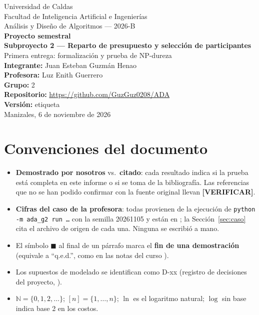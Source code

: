 \documentclass[11pt,a4paper]{article}
\theoremstyle{plain}
\theoremstyle{definition}
\theoremstyle{remark}
\newcommand{\Nat}{\mathbb{N}}
\newcommand{\VER}{\textbf{[VERIFICAR]}}
\begin{document}
\begin{titlepage}
\centering
{\large Universidad de Caldas\\ Facultad de Inteligencia Artificial e Ingenierías\\[0.3cm]}
{\large Análisis y Diseño de Algoritmos — 2026-B\\[2cm]}
{\LARGE\bfseries Proyecto semestral\\[0.3cm]
Subproyecto 2 — Reparto de presupuesto y selección de participantes\\[0.6cm]}
{\Large Primera entrega: formalización y prueba de NP-dureza\\[2cm]}
{\large \textbf{Integrante:} Juan Esteban Guzmán Henao\\[0.3cm]
\textbf{Profesora:} Luz Enith Guerrero\\[0.3cm]
\textbf{Grupo:} 2\\[0.3cm]
\textbf{Repositorio:} \url{https://github.com/GuzGuz0208/ADA}\\[0.3cm]
\textbf{Versión:} etiqueta \\[2cm]}
{\large Manizales, 6 de noviembre de 2026}
\end{titlepage}

\tableofcontents
\newpage

\section*{Convenciones del documento}
\begin{itemize}[leftmargin=*]
\item \textbf{Demostrado por nosotros} vs.\ \textbf{citado}: cada resultado indica si la prueba está completa en este informe o si se toma de la bibliografía. Las referencias que no se han podido confirmar con la fuente original llevan \VER.
\item \textbf{Cifras del caso de la profesora}: todas provienen de la ejecución de \texttt{python -m ada\_g2 run \dots} con la semilla 20261105 y están en ; la Sección~\ref{sec:caso} cita el archivo de origen de cada una. Ninguna se escribió a mano.
\item El símbolo $\blacksquare$ al final de un párrafo marca el \textbf{fin de una demostración} (equivale a ``q.e.d.'', como en las notas del curso \cite{notas}).
\item Los supuestos de modelado se identifican como D-xx (registro de decisiones del proyecto, ).
\item $\Nat=\{0,1,2,\dots\}$; $[n]=\{1,\dots,n\}$; $\ln$ es el logaritmo natural; $\log$ sin base indica base 2 en los costos.
\end{itemize}






\end{document}
